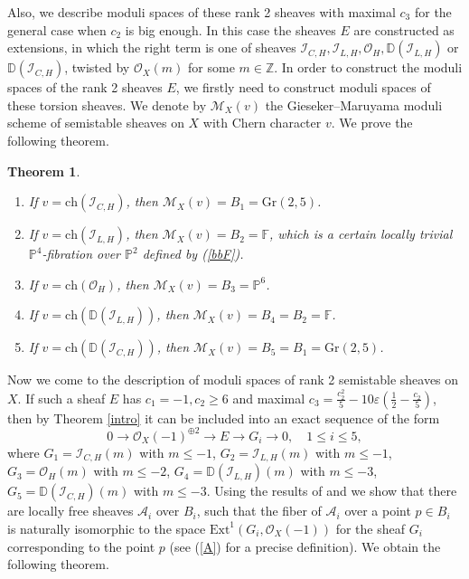\documentclass{amsart}
\newtheorem{theorem}{Theorem}[section]
\begin{document}
	Also, we describe moduli spaces of these rank 2 sheaves with maximal $c_3$ for the general case when $c_2$ is big enough. In this case the sheaves $E$ are constructed as extensions, in which the right term is one of sheaves $\mathcal I_{C,H},\mathcal I_{L,H},\mathcal O_H,\mathbb D(\mathcal I_{L,H})$ or $\mathbb D(\mathcal I_{C,H})$, twisted by $\mathcal O_X(m)$ for some $m\in\mathbb Z$. In order to construct the moduli spaces of the rank 2 sheaves $E$, we firstly need to construct moduli spaces of these torsion sheaves. We denote by $\mathcal M_X(v)$ the Gieseker--Maruyama moduli scheme of semistable sheaves on $X$ with Chern character $v$. We prove the following theorem.
	
	\begin{theorem}\label{torsion thm}
		\begin{enumerate}
			\item If $v=\mathrm{ch}(\mathcal I_{C,H})$, then $\mathcal M_X(v)=B_1=\mathrm{Gr}(2,5)$.
			\item If $v=\mathrm{ch}(\mathcal I_{L,H})$, then $\mathcal M_X(v)=B_2=\mathbb F$, which is a certain locally trivial $\mathbb P^4$-fibration over $\mathbb P^2$ defined by (\ref{bbF}).
			\item If $v=\mathrm{ch}(\mathcal O_H)$, then $\mathcal M_X(v)=B_3=\mathbb P^6$.
			\item If $v=\mathrm{ch}(\mathbb D(\mathcal I_{L,H}))$, then $\mathcal M_X(v)=B_4=B_2=\mathbb F$.
			\item If $v=\mathrm{ch}(\mathbb D(\mathcal I_{C,H}))$, then $\mathcal M_X(v)=B_5=B_1=\mathrm{Gr}(2,5)$.
		\end{enumerate}
	\end{theorem} 
	
	Now we come to the description of moduli spaces of rank 2 semistable sheaves on $X$. If such a sheaf $E$ has $c_1=-1,c_2\ge 6$ and maximal $c_3=\frac{c_2^2}{5}-10\varepsilon(\frac 12-\frac{c_2}{5})$, then by Theorem \ref{intro} it can be included into an exact sequence of the form
	\begin{equation}\label{extension2}0\to\mathcal O_X(-1)^{\oplus 2}\to E\to G_i\to 0,\quad 1\le i\le 5,
	\end{equation}
	where $G_1=\mathcal I_{C,H}(m)$ with $m\le -1$, $G_2=\mathcal I_{L,H}(m)$ with $m\le -1$, $G_3=\mathcal O_H(m)$ with $m\le -2$, $G_4=\mathbb D(\mathcal I_{L,H})(m)$ with $m\le -3$, $G_5=\mathbb D(\mathcal I_{C,H})(m)$ with $m\le -3$. Using the results of \cite{BPS} and \cite{Lan} we show that there are locally free sheaves $\mathcal A_i$ over $B_i$, such that the fiber of $\mathcal A_i$ over a point $p\in B_i$ is naturally isomorphic to the space $\mathrm{Ext}^1(G_i,\mathcal O_X(-1))$ for the sheaf $G_i$ corresponding to the point $p$ (see (\ref{A}) for a precise definition). We obtain the following theorem.
	
\end{document}
